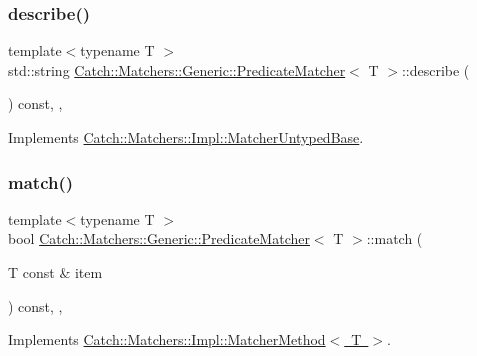 \subsubsection{\texorpdfstring{describe()}{describe()}}
{\footnotesize\ttfamily template$<$typename T $>$ \\
std\+::string \mbox{\hyperlink{class_catch_1_1_matchers_1_1_generic_1_1_predicate_matcher}{Catch\+::\+Matchers\+::\+Generic\+::\+Predicate\+Matcher}}$<$ T $>$\+::describe (\begin{DoxyParamCaption}{ }\end{DoxyParamCaption}) const\hspace{0.3cm}{\ttfamily [inline]}, {\ttfamily [override]}, {\ttfamily [virtual]}}



Implements \mbox{\hyperlink{class_catch_1_1_matchers_1_1_impl_1_1_matcher_untyped_base_a91d3a907dbfcbb596077df24f6e11fe2}{Catch\+::\+Matchers\+::\+Impl\+::\+Matcher\+Untyped\+Base}}.

\mbox{\label{class_catch_1_1_matchers_1_1_generic_1_1_predicate_matcher_a2ec0e8ec19c4c5e26271d59a06a62b52}} 
\subsubsection{\texorpdfstring{match()}{match()}}
{\footnotesize\ttfamily template$<$typename T $>$ \\
bool \mbox{\hyperlink{class_catch_1_1_matchers_1_1_generic_1_1_predicate_matcher}{Catch\+::\+Matchers\+::\+Generic\+::\+Predicate\+Matcher}}$<$ T $>$\+::match (\begin{DoxyParamCaption}\item[{T const \&}]{item }\end{DoxyParamCaption}) const\hspace{0.3cm}{\ttfamily [inline]}, {\ttfamily [override]}, {\ttfamily [virtual]}}



Implements \mbox{\hyperlink{struct_catch_1_1_matchers_1_1_impl_1_1_matcher_method_ae0920ff9e817acf08e1bb0cbcb044e30}{Catch\+::\+Matchers\+::\+Impl\+::\+Matcher\+Method$<$ T $>$}}.



